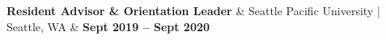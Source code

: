 \textbf{Resident Advisor \& Orientation Leader} & 
Seattle Pacific University | Seattle, WA & 
\textbf{Sept 2019 -- Sept 2020}